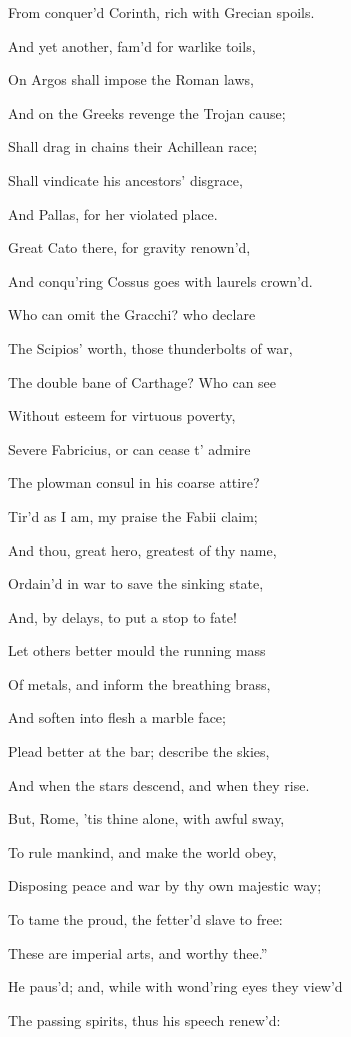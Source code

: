 From conquer’d Corinth, rich with Grecian spoils.

And yet another, fam’d for warlike toils,

On Argos shall impose the Roman laws,

And on the Greeks revenge the Trojan cause;

Shall drag in chains their Achillean race;

Shall vindicate his ancestors’ disgrace,

And Pallas, for her violated place.

Great Cato there, for gravity renown’d,

And conqu’ring Cossus goes with laurels crown’d.

Who can omit the Gracchi? who declare

The Scipios’ worth, those thunderbolts of war,

The double bane of Carthage? Who can see

Without esteem for virtuous poverty,

Severe Fabricius, or can cease t’ admire

The plowman consul in his coarse attire?

Tir’d as I am, my praise the Fabii claim;

And thou, great hero, greatest of thy name,

Ordain’d in war to save the sinking state,

And, by delays, to put a stop to fate!

Let others better mould the running mass

Of metals, and inform the breathing brass,

And soften into flesh a marble face;

Plead better at the bar; describe the skies,

And when the stars descend, and when they rise.

But, Rome, ’tis thine alone, with awful sway,

To rule mankind, and make the world obey,

Disposing peace and war by thy own majestic way;

To tame the proud, the fetter’d slave to free:

These are imperial arts, and worthy thee.”

He paus’d; and, while with wond’ring eyes they view’d

The passing spirits, thus his speech renew’d:

